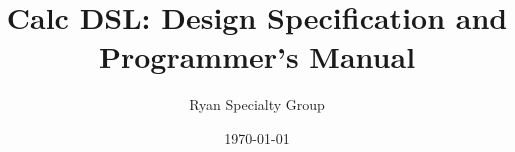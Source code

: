 \documentclass[10pt]{book}
\author{Ryan Specialty Group}
\date{\today}
\begin{document}
\title{Calc DSL: Design Specification and Programmer's Manual}
\maketitle

\tableofcontents


\end{document}
